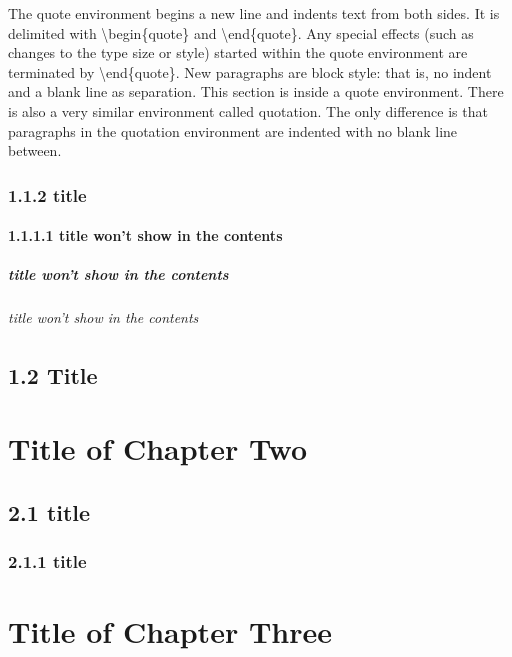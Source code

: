\documentclass[a4paper,11pt,UTF8,openright]{book}
\begin{document}
The quote environment begins a new line and indents text from both sides. It
is delimited with \textbackslash begin\{quote\} and \textbackslash end\{quote\}. Any special effects (such as changes to the type size or style) started within the quote environment
are terminated by \textbackslash end\{quote\}.
New paragraphs are block style: that is, no indent and a blank line as separation. This section is inside a quote environment. There is also a very similar environment called quotation. The only difference is that paragraphs in the quotation environment are indented with no blank line between.



\subsection{1.1.2 title}
\lipsum[1-3]

\subsubsection{1.1.1.1 title won't show in the contents}
\lipsum[1-3]

\paragraph{title won't show in the contents}
\lipsum[1-5]

\subparagraph{title won't show in the contents}
\lipsum[1-3]

\section{1.2 Title}
\lipsum[1-5]

\chapter{Title of Chapter Two}
\lipsum[1-3]

\section{2.1 title}
\lipsum[1-5]

\subsection{2.1.1 title}
\lipsum[1-5]

\chapter{Title of Chapter Three}
\lipsum[1-3]
\end{document}
